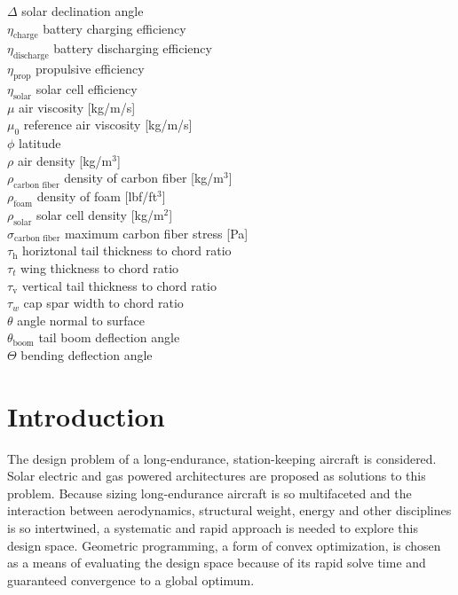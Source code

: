 \documentclass[]{aiaa-tc}%
\begin{document}
\begin{multicols}{2}
\begin{tabbing}
$\Delta$ \> solar declination angle \\
$\eta_{\text{charge}}$ \> battery charging efficiency \\
$\eta_{\text{discharge}}$ \> battery discharging efficiency \\
$\eta_{\text{prop}}$ \> propulsive efficiency \\
$\eta_{\text{solar}}$ \> solar cell efficiency \\
$\mu$ \> air viscosity [kg/m/s] \\
$\mu_0$ \> reference air viscosity [kg/m/s] \\
$\phi$ \> latitude \\
$\rho$ \> air density [kg/m$^3$] \\
$\rho_{\text{carbon fiber}}$ \> density of carbon fiber [kg/m$^3$] \\
$\rho_{\text{foam}}$ \> density of foam [lbf/ft$^3$] \\
$\rho_{\text{solar}}$ \> solar cell density [kg/m$^2$] \\
$\sigma_{\text{carbon fiber}}$ \> maximum carbon fiber stress [Pa] \\
$\tau_{\text{h}}$ \> horiztonal tail thickness to chord ratio \\
$\tau_t$ \> wing thickness to chord ratio \\
$\tau_{\text{v}}$ \> vertical tail thickness to chord ratio \\
$\tau_w$ \> cap spar width to chord ratio \\
$\theta$ \> angle normal to surface \\
$\theta_{\text{boom}}$ \> tail boom deflection angle \\
$\Theta$ \> bending deflection angle 
 \end{tabbing}

\end{multicols}

\section{Introduction}

The design problem of a long-endurance, station-keeping aircraft is considered.
Solar electric and gas powered architectures are proposed as solutions to this problem.
Because sizing long-endurance aircraft is so multifaceted and the interaction between aerodynamics, structural weight, energy and other disciplines is so intertwined, a systematic and rapid approach is needed to explore this design space.
Geometric programming, a form of convex optimization, is chosen as a means of evaluating the design space because of its rapid solve time and guaranteed convergence to a global optimum.
\end{document}
